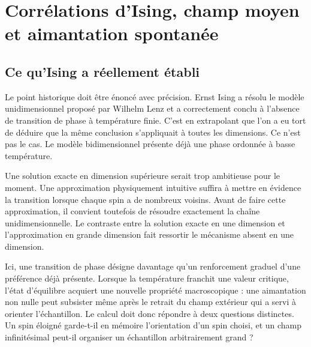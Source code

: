 \chapter{Corrélations d’Ising, champ moyen et aimantation spontanée}


\section{Ce qu’Ising a réellement établi}

Le point historique doit être énoncé avec précision. Ernst Ising a résolu le modèle unidimensionnel proposé par Wilhelm Lenz et a correctement conclu à l’absence de transition de phase à température finie. C’est en extrapolant que l’on a eu tort de déduire que la même conclusion s’appliquait à toutes les dimensions. Ce n’est pas le cas. Le modèle bidimensionnel présente déjà une phase ordonnée à basse température.

Une solution exacte en dimension supérieure serait trop ambitieuse pour le moment. Une approximation physiquement intuitive suffira à mettre en évidence la transition lorsque chaque spin a de nombreux voisins. Avant de faire cette approximation, il convient toutefois de résoudre exactement la chaîne unidimensionnelle. Le contraste entre la solution exacte en une dimension et l’approximation en grande dimension fait ressortir le mécanisme absent en une dimension.

Ici, une transition de phase désigne davantage qu’un renforcement graduel d’une préférence déjà présente. Lorsque la température franchit une valeur critique, l’état d’équilibre acquiert une nouvelle propriété macroscopique : une aimantation non nulle peut subsister même après le retrait du champ extérieur qui a servi à orienter l’échantillon. Le calcul doit donc répondre à deux questions distinctes. Un spin éloigné garde-t-il en mémoire l’orientation d’un spin choisi, et un champ infinitésimal peut-il organiser un échantillon arbitrairement grand ?

